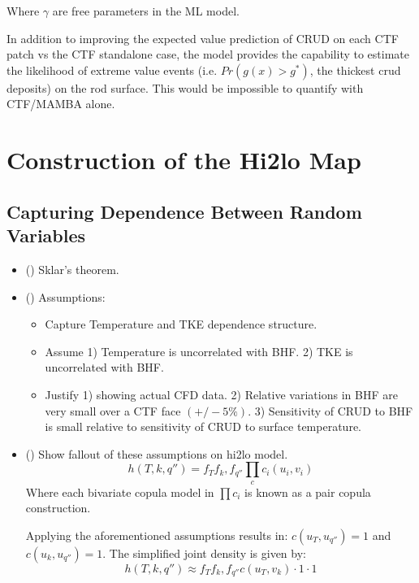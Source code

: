 \begin{algorithm}[H]

\end{algorithm}
Where $\gamma$ are free parameters in the ML model.
\bigskip

In addition to improving the expected value prediction of CRUD on each CTF patch vs the CTF standalone case, the model provides the capability to estimate the likelihood of extreme value events (i.e. $Pr(g(x) > g^*)$, the thickest crud deposits) on the rod surface.  This would be impossible to quantify with CTF/MAMBA alone.


\section{Construction of the Hi2lo Map}

\subsection{Capturing Dependence Between Random Variables}
\begin{itemize}
	\item (\checkmark) Sklar's theorem.
	\item (\checkmark) Assumptions: 
	\begin{itemize}
		\item Capture Temperature and TKE dependence structure.
		\item Assume 1) Temperature is uncorrelated with BHF.  2) TKE is uncorrelated with BHF.
		\item Justify 1) showing actual CFD data. 2) Relative variations in BHF are very small over a CTF face $(+/- 5\%)$.  3) Sensitivity of CRUD to BHF is small relative to sensitivity of CRUD to surface temperature.
	\end{itemize}
	\item (\checkmark) Show fallout of these assumptions on hi2lo model.
	\begin{equation}
		h(T, k, q'') = f_T f_k, f_{q''} \prod_c c_i(u_i, v_i)
	\end{equation}
	Where each bivariate copula model in $\prod c_i $ is known as a pair copula construction. 
	
	Applying the aforementioned assumptions results in: $c(u_T, u_{q''}) = 1$ and $c(u_{k}, u_{q''}) = 1$. The simplified joint density is given by:
	\begin{equation}
		h(T, k, q'') \approx  f_T f_k, f_{q''} c(u_{T}, v_{k})  \cdot 1 \cdot 1
    \end{equation}	 
\end{itemize}


